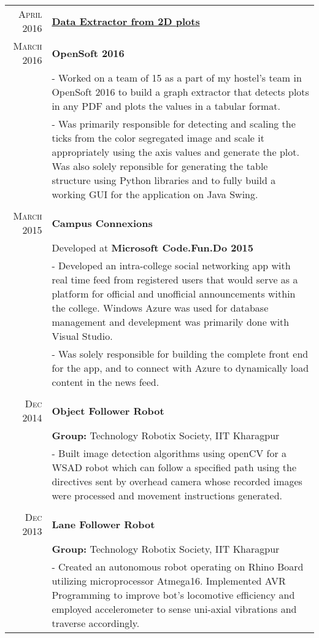 \documentclass[a4paper,10pt]{extarticle} %
\begin{document}
\begin{tabular}{r|p{16cm}}

\textsc{April 2016} & \textbf{\href{https://github.com/ghostwriternr/Opensoft-2016}{Data Extractor from 2D plots}} \\
\textsc{March 2016} & \textbf{OpenSoft 2016}\\
& \footnotesize{- Worked on a team of 15 as a part of my hostel's team in OpenSoft 2016 to build a graph extractor that detects plots in any PDF and plots the values in a tabular format.}\\
& \footnotesize{- Was primarily responsible for detecting and scaling the ticks from the color segregated image and scale it appropriately using the axis values and generate the plot. Was also solely reponsible for generating the table structure using Python libraries and to fully build a working GUI for the application on Java Swing.}\\
\multicolumn{2}{c}{} \\

\textsc{March 2015} & \textbf{Campus Connexions}\\
& Developed at \textbf{Microsoft Code.Fun.Do 2015}\\
& \footnotesize{- Developed an intra-college social networking app with real time feed from registered users that would serve as a platform for official and unofficial announcements within the college. Windows Azure was used for database management and develepment was primarily done with Visual Studio.}\\
& \footnotesize{- Was solely responsible for building the complete front end for the app, and to connect with Azure to dynamically load content in the news feed.}\\
\multicolumn{2}{c}{} \\

\textsc{Dec 2014} & \textbf{Object Follower Robot} \\
& \textbf{Group: }\textmd{Technology Robotix Society}, IIT Kharagpur\\
& \footnotesize{- Built image detection algorithms using openCV for a WSAD robot which can follow a specified path using the directives sent by overhead camera whose recorded images were processed and movement instructions generated.}\\
\multicolumn{2}{c}{} \\

\textsc{Dec 2013} & \textbf{Lane Follower Robot} \\
& \textbf{Group: }\textmd{Technology Robotix Society}, IIT Kharagpur\\
& \footnotesize{- Created an autonomous robot operating on Rhino Board utilizing microprocessor Atmega16. Implemented AVR Programming to improve bot's locomotive efficiency and employed accelerometer to sense uni-axial vibrations and traverse accordingly.}\\

\end{tabular}
\end{document}
